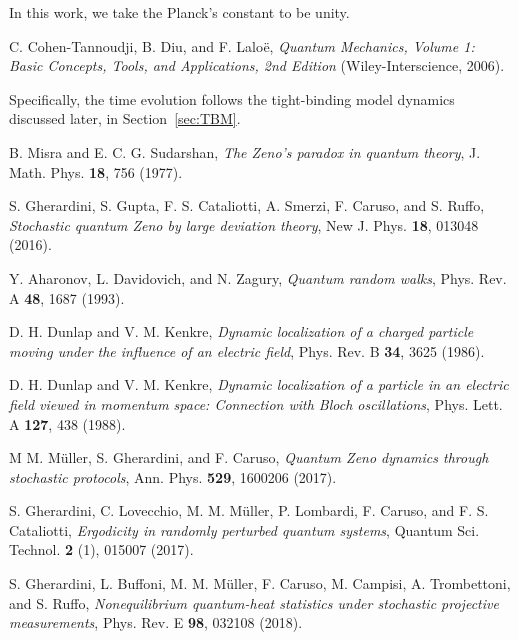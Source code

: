 \documentclass[12pt]{iopart}
\begin{document}
\vspace{0.5cm}
\begin{thebibliography}{99}

 In this work, we take the Planck's constant to be unity. 

  C. Cohen-Tannoudji, B. Diu, and F. Laloë, \textit{Quantum Mechanics, Volume 1: Basic Concepts, Tools, and Applications, 2nd Edition} (Wiley-Interscience, 2006).
  
  Specifically, the time evolution follows the tight-binding model dynamics discussed later, in Section~\ref{sec:TBM}.
  
  B. Misra and E. C. G. Sudarshan,  \textit{The
  Zeno’s paradox in quantum theory}, J. Math. Phys. \textbf{18},
  756 (1977).
  
S. Gherardini, S. Gupta, F. S. Cataliotti, A. Smerzi, F. Caruso, and S. Ruffo, \textit{Stochastic quantum Zeno by large deviation theory},  New J.  Phys. {\bf 18}, 013048 (2016).

  Y. Aharonov, L. Davidovich, and N. Zagury, \textit{Quantum random walks}, Phys. Rev. A \textbf{48}, 1687 (1993).

  D. H. Dunlap and V. M. Kenkre, \textit{Dynamic localization of a charged particle moving
  under the influence of an electric field}, Phys. Rev. B \textbf{34}, 3625 (1986).

  D. H. Dunlap and V. M. Kenkre, \textit{Dynamic localization of a particle in an electric field
  viewed in momentum space: Connection with Bloch oscillations}, Phys. Lett. A \textbf{127},
  438 (1988).
  
M M. M\"{u}ller, S. Gherardini, and F. Caruso, \textit{Quantum Zeno dynamics through stochastic protocols}, Ann.  Phys.  {\bf 529}, 1600206 (2017).

S. Gherardini, C. Lovecchio, M. M. M\"{u}ller, P. Lombardi, F. Caruso, and F. S. Cataliotti, \textit{Ergodicity in randomly perturbed quantum systems}, Quantum Sci. Technol. \textbf{2} (1), 015007 (2017).

S. Gherardini, L. Buffoni, M. M. M\"{u}ller, F. Caruso, M. Campisi, A. Trombettoni, and S. Ruffo, \textit{Nonequilibrium quantum-heat statistics under stochastic projective measurements},  Phys.  Rev.  E  {\bf 98},  032108 (2018).


\end{thebibliography}
\end{document}
